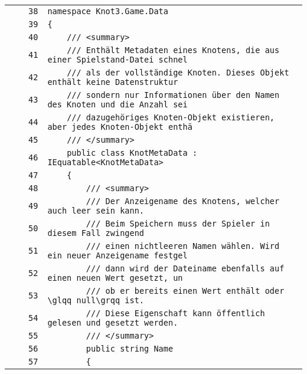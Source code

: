 \documentclass[a4paper,10pt]{article}
\begin{document}
\begin{longtable}[l]{lrrl}
\cellcolor{gray} &  & \verb~38~ & \verb~namespace Knot3.Game.Data~\\
\cellcolor{gray} &  & \verb~39~ & \verb~{~\\
\cellcolor{gray} &  & \verb~40~ & \verb~    /// <summary>~\\
\cellcolor{gray} &  & \verb~41~ & \verb~    /// Enthält Metadaten eines Knotens, die aus einer Spielstand-Datei schnel~\\
\cellcolor{gray} &  & \verb~42~ & \verb~    /// als der vollständige Knoten. Dieses Objekt enthält keine Datenstruktur~\\
\cellcolor{gray} &  & \verb~43~ & \verb~    /// sondern nur Informationen über den Namen des Knoten und die Anzahl sei~\\
\cellcolor{gray} &  & \verb~44~ & \verb~    /// dazugehöriges Knoten-Objekt existieren, aber jedes Knoten-Objekt enthä~\\
\cellcolor{gray} &  & \verb~45~ & \verb~    /// </summary>~\\
\cellcolor{gray} &  & \verb~46~ & \verb~    public class KnotMetaData : IEquatable<KnotMetaData>~\\
\cellcolor{gray} &  & \verb~47~ & \verb~    {~\\
\cellcolor{gray} &  & \verb~48~ & \verb~        /// <summary>~\\
\cellcolor{gray} &  & \verb~49~ & \verb~        /// Der Anzeigename des Knotens, welcher auch leer sein kann.~\\
\cellcolor{gray} &  & \verb~50~ & \verb~        /// Beim Speichern muss der Spieler in diesem Fall zwingend~\\
\cellcolor{gray} &  & \verb~51~ & \verb~        /// einen nichtleeren Namen wählen. Wird ein neuer Anzeigename festgel~\\
\cellcolor{gray} &  & \verb~52~ & \verb~        /// dann wird der Dateiname ebenfalls auf einen neuen Wert gesetzt, un~\\
\cellcolor{gray} &  & \verb~53~ & \verb~        /// ob er bereits einen Wert enthält oder \glqq null\grqq ist.~\\
\cellcolor{gray} &  & \verb~54~ & \verb~        /// Diese Eigenschaft kann öffentlich gelesen und gesetzt werden.~\\
\cellcolor{gray} &  & \verb~55~ & \verb~        /// </summary>~\\
\cellcolor{gray} &  & \verb~56~ & \verb~        public string Name~\\
\cellcolor{gray} &  & \verb~57~ & \verb~        {~\\

\end{longtable}
\end{document}
